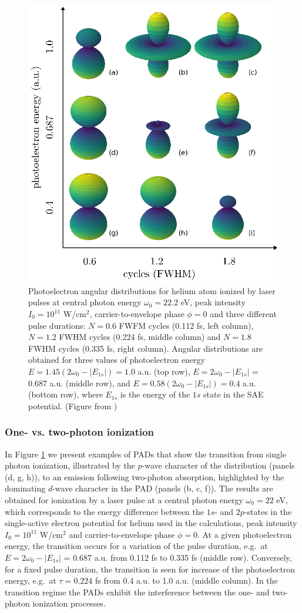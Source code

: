 \begin{figure}[!ht]
\centering
\includegraphics[width=0.5\linewidth]{figs/Photo_ionization/short_pulse/fig_1.eps}
\caption{
Photoelectron angular distributions for helium atom ionized by laser pulses at central photon energy $\omega_0 = 22.2$ eV, peak intensity $I_0 = 10^{11}$ W/cm$^2$, carrier-to-envelope phase $\phi = 0$ and three different pulse durations: $N = 0.6$ FWFM cycles (0.112 fs, left column), $N = 1.2$ FWHM cycles (0.224 fs, middle column) and $N = 1.8$ FWHM cycles (0.335 fs, right column). Angular distributions are obtained for three values of photoelectron energy $E = 1.45(2\omega_0 - |E_{1s}|) = 1.0$ a.u. (top row), $E = 2\omega_0 - |E_{1s}|$ = 0.687 a.u. (middle row), and $E = 0.58(2\omega_0 - |E_{1s}|) = 0.4$ a.u. (bottom row), where $E_{1s}$ is the energy of the $1s$ state in the SAE potential. (Figure from \cite{venzke2020_ionization})
} 
  \label{fig:pads}
\end{figure}

\subsubsection{\label{ssub:pads}One- vs. two-photon ionization}
In Figure \ref{fig:pads} we present examples of PADs that show the transition from single photon ionization, illustrated by the $p$-wave character of the distribution (panels (d, g, h)), to an emission following two-photon absorption, highlighted by the dominating $d$-wave character in the PAD (panels (b, c, f)). The results are obtained for ionization by a laser pulse at a central photon energy $\omega_0 = 22$ eV, which corresponds to the energy difference between the $1s$- and $2p$-states in the single-active electron potential for helium used in the calculations, peak intensity $I_0 = 10^{11}$ W/cm$^2$ and carrier-to-envelope phase $\phi = 0$. At a given photoelectron energy, the transition occurs for a variation of the pulse duration, e.g.\ at $E = 2\omega_0 - |E_{1s}|$ = 0.687 a.u. from 0.112 fs to 0.335 fs (middle row). Conversely, for a fixed pulse duration, the transition is seen for increase of the photoelectron energy, e.g.\ at $\tau = 0.224$ fs from 0.4 a.u. to 1.0 a.u. (middle column). In the transition regime the PADs exhibit the interference between the one- and two-photon ionization processes. 

